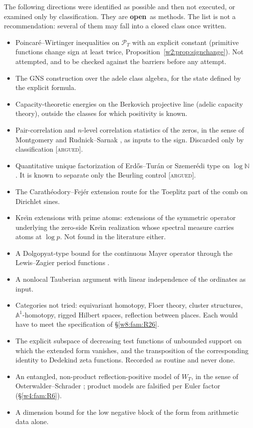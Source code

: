 \documentclass[11pt]{amsart}
\theoremstyle{definition}
\theoremstyle{remark}
\numberwithin{equation}{section}
\newcommand{\N}{\mathbb{N}}
\newcommand{\PT}{\mathcal{P}_T}                        %
\newcommand{\WT}{W_T}                                  %
\newcommand{\stag}[1]{\textsc{[#1]}}
\newcommand{\ARGUED}{\stag{argued}}
\newcommand{\rtag}[1]{\textbf{\small\textsf{#1}}}
\newcommand{\openR}{\rtag{open}}
\begin{document}
The following directions were identified as possible and then not executed, or examined only by classification. They
are \openR\ as methods. The list is not a recommendation: several of them may fall into a closed class once written.
\begin{itemize}
\item Poincar\'e--Wirtinger inequalities on $\PT$ with an explicit constant (primitive functions change sign at least
  twice, Proposition~\ref{w2:prop:signchange}). Not attempted, and to be checked against the barriers before any attempt.
\item The GNS construction over the adele class algebra, for the state defined by the explicit formula.
\item Capacity-theoretic energies on the Berkovich projective line (adelic capacity theory), outside the classes for
  which positivity is known.
\item Pair-correlation and $n$-level correlation statistics of the zeros, in the sense of Montgomery
  \cite{Montgomery1973} and Rudnick--Sarnak \cite{RudnickSarnak1996}, as inputs to the sign. Discarded only by
  classification \ARGUED.
\item Quantitative unique factorization of Erd\H{o}s--Tur\'an or Szemer\'edi type on $\log\N$. It is known to separate
  only the Beurling control \ARGUED.
\item The Carath\'eodory--Fej\'er extension route for the Toeplitz part of the comb on Dirichlet sines.
\item Kre\u{\i}n extensions with prime atoms: extensions of the symmetric operator underlying the zero-side Kre\u{\i}n
  realization whose spectral measure carries atoms at $\log p$. Not found in the literature either.
\item A Dolgopyat-type bound for the continuous Mayer operator through the Lewis--Zagier period functions
  \cite{LewisZagier2001}.
\item A nonlocal Tauberian argument with linear independence of the ordinates as input.
\item Categories not tried: equivariant homotopy, Floer theory, cluster structures, $\mathbb A^1$-homotopy, rigged
  Hilbert spaces, reflection between places. Each would have to meet the specification of \S\ref{w8:fam:R26}.
\item The explicit subspace of decreasing test functions of unbounded support on which the extended form vanishes,
  and the transposition of the corresponding identity to Dedekind zeta functions. Recorded as routine and never done.
\item An entangled, non-product reflection-positive model of $\WT$, in the sense of Osterwalder--Schrader
  \cite{OsterwalderSchrader1973}; product models are falsified per Euler factor (\S\ref{w4:fam:R6}).
\item A dimension bound for the low negative block of the form from arithmetic data alone.
\end{itemize}
\end{document}
